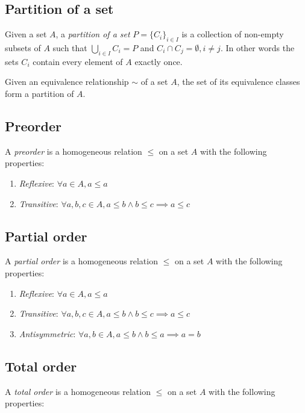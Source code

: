 \documentclass{article}
\begin{document}
\subsection{Partition of a set}

Given a set \(A\), a \textit{partition of a set} \(P={\{C_i\}}_{i\in I}\) is a collection of
non-empty subsets of \(A\) such that \(\bigcup_{i\in I} C_i = P\) and
\(C_i \cap C_j = \emptyset, i \neq j\). In other words the sets \(C_i\)
contain every element of \(A\) exactly once.

Given an equivalence relationship \(\sim\) of a set \(A\),
the set of its equivalence classes form a partition of \(A\).

\subsection{Preorder}

A \textit{preorder} is a homogeneous relation \(\leq\) on a set \(A\)
with the following properties:
\begin{enumerate}
    \item \textit{Reflexive}: \(\forall a \in A, a \leq a\)
    \item \textit{Transitive}: \(\forall a,b,c \in A, a \leq b \land b \leq c \implies a \leq c\)
\end{enumerate}

\subsection{Partial order}

A \textit{partial order} is a homogeneous relation \(\leq\) on a set \(A\)
with the following properties:
\begin{enumerate}
    \item \textit{Reflexive}: \(\forall a \in A, a \leq a\)
    \item \textit{Transitive}: \(\forall a,b,c \in A, a \leq b \land b \leq c \implies a \leq c\)
    \item \textit{Antisymmetric}: \(\forall a,b \in A, a \leq b \land b \leq a \implies a=b\)
\end{enumerate}

\subsection{Total order}

A \textit{total order} is a homogeneous relation \(\leq\) on a set \(A\)
with the following properties:
\end{document}
